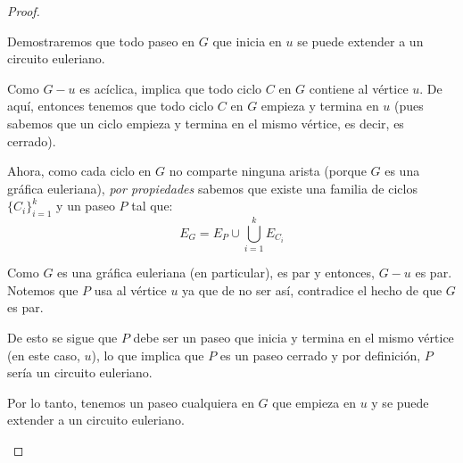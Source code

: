 \documentclass{article}
\begin{document}
\begin{enumerate}
\begin{proof}
\begin{itemize}
        Demostraremos que todo paseo en $G$ que inicia en $u$ se puede extender a un circuito euleriano.

        Como $G - u$ es acíclica, implica que todo ciclo $C$ en $G$ contiene al vértice $u$. De aquí, entonces tenemos que todo ciclo $C$ en $G$ empieza y termina en $u$ (pues sabemos que un ciclo empieza y termina en el mismo vértice, es decir, es cerrado).

        Ahora, como cada ciclo en $G$ no comparte ninguna arista (porque $G$ es una gráfica euleriana), \textit{por propiedades} sabemos que existe una familia de ciclos $\bigg\{ C_{i}\bigg\}_{i = 1}^{k}$ y un paseo $P$ tal que:
        $$E_{G} = E_{P} \cup \bigcup_{i = 1}^{k} E_{C_{i}}$$

        Como $G$ es una gráfica euleriana (en particular), es par y entonces, $G - u$ es par. Notemos que $P$ usa al vértice $u$ ya que de no ser así, contradice el hecho de que $G$ es par.

        De esto se sigue que $P$ debe ser un paseo que inicia y termina en el mismo vértice (en este caso, $u$), lo que implica que $P$ es un paseo cerrado y por definición, $P$ sería un circuito euleriano.

        Por lo tanto, tenemos un paseo cualquiera en $G$ que empieza en $u$ y se puede extender a un circuito euleriano.
    \end{itemize}
  \end{proof}
\end{enumerate}
\end{document}
